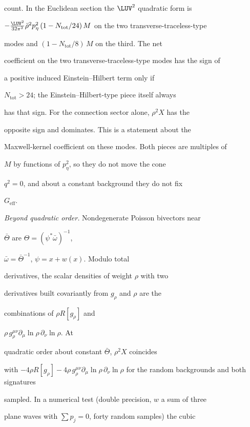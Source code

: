count. In the Euclidean section the \(\LUV^2\) quadratic form is

\(-\tfrac{\LUV^2}{32\pi^2}\bar\rho^{2}p_\eta^2\,

(1-N_{\mathrm{tot}}/24)\,M\) on the two transverse-traceless-type

modes and \((1-N_{\mathrm{tot}}/8)\,M\) on the third. The net

coefficient on the two transverse-traceless-type modes has the sign of

a positive induced Einstein--Hilbert term only if

\(N_{\mathrm{tot}}>24\); the Einstein--Hilbert-type piece itself always

has that sign. For the connection sector alone, \(\rho^2X\) has the

opposite sign and dominates. This is a statement about the

Maxwell-kernel coefficient on these modes. Both pieces are multiples of

\(M\) by functions of \(p_\eta^2\), so they do not move the cone

\(q^2=0\), and about a constant background they do not fix

\(G_{\mathrm{eff}}\).



\emph{Beyond quadratic order.} Nondegenerate Poisson bivectors near

\(\bar\Theta\) are \(\Theta=(\psi^*\bar\omega)^{-1}\),

\(\bar\omega=\bar\Theta^{-1}\), \(\psi=x+w(x)\). Modulo total

derivatives, the scalar densities of weight \(\rho\) with two

derivatives built covariantly from \(g_\rho\) and \(\rho\) are the

combinations of \(\rho R[g_\rho]\) and

\(\rho\,g_\rho^{\mu\nu}\partial_\mu\ln\rho\,\partial_\nu\ln\rho\). At

quadratic order about constant \(\bar\Theta\), \(\rho^2X\) coincides

with \(-4\rho R[g_\rho]-4\rho\,g_\rho^{\mu\nu}\partial_\mu\ln\rho\,

\partial_\nu\ln\rho\) for the random backgrounds and both signatures

sampled. In a numerical test (double precision, \(w\) a sum of three

plane waves with \(\sum p_j=0\), forty random samples) the cubic

